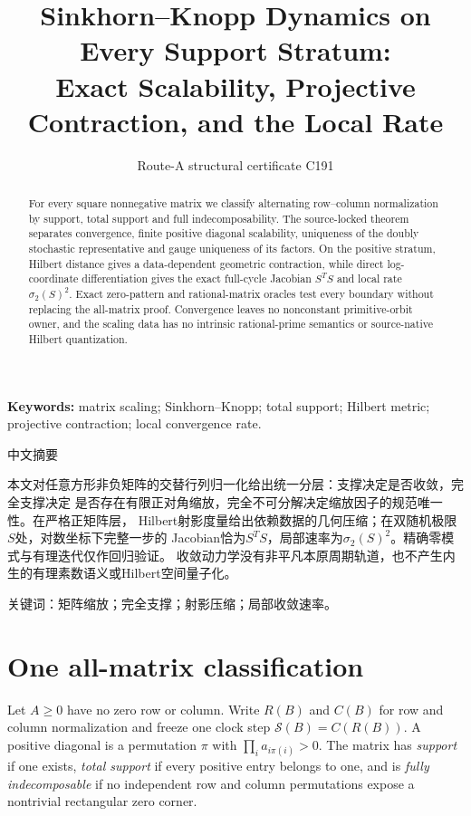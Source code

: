 \documentclass[9pt]{extarticle}
\title{Sinkhorn--Knopp Dynamics on Every Support Stratum:\\
Exact Scalability, Projective Contraction, and the Local Rate}
\author{Route-A structural certificate C191}
\date{}
\begin{document}
\maketitle
\begin{abstract}
For every square nonnegative matrix we classify alternating row--column
normalization by support, total support and full indecomposability.  The
source-locked theorem separates convergence, finite positive diagonal
scalability, uniqueness of the doubly stochastic representative and gauge
uniqueness of its factors.  On the positive stratum, Hilbert distance gives a
data-dependent geometric contraction, while direct log-coordinate
differentiation gives the exact full-cycle Jacobian $S^TS$ and local rate
$\sigma_2(S)^2$.  Exact zero-pattern and rational-matrix oracles test every
boundary without replacing the all-matrix proof.  Convergence leaves no
nonconstant primitive-orbit owner, and the scaling data has no intrinsic
rational-prime semantics or source-native Hilbert quantization.
\end{abstract}
\noindent\textbf{Keywords:} matrix scaling; Sinkhorn--Knopp; total support;
Hilbert metric; projective contraction; local convergence rate.

\begin{otherlanguage}{chinese-simplified}
\begin{center}{\large 中文摘要}\end{center}
本文对任意方形非负矩阵的交替行列归一化给出统一分层：支撑决定是否收敛，完全支撑决定
是否存在有限正对角缩放，完全不可分解决定缩放因子的规范唯一性。在严格正矩阵层，
\foreignlanguage{english}{Hilbert}射影度量给出依赖数据的几何压缩；在双随机极限$S$处，对数坐标下完整一步的
\foreignlanguage{english}{Jacobian}恰为$S^TS$，局部速率为$\sigma_2(S)^2$。精确零模式与有理迭代仅作回归验证。
收敛动力学没有非平凡本原周期轨道，也不产生内生的有理素数语义或\foreignlanguage{english}{Hilbert}空间量子化。

\noindent 关键词：矩阵缩放；完全支撑；射影压缩；局部收敛速率。
\end{otherlanguage}

\section{One all-matrix classification}
Let $A\ge0$ have no zero row or column.  Write $R(B)$ and $C(B)$ for row
and column normalization and freeze one clock step
$\mathcal S(B)=C(R(B))$.  A positive diagonal is a permutation $\pi$ with
$\prod_i a_{i\pi(i)}>0$.  The matrix has \emph{support} if one exists,
\emph{total support} if every positive entry belongs to one, and is
\emph{fully indecomposable} if no independent row and column permutations
expose a nontrivial rectangular zero corner.
\end{document}
